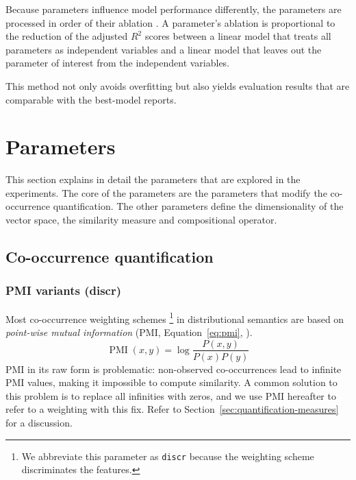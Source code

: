 Because parameters influence model performance differently, the parameters are processed in order of their ablation \cite{lapesa2014large}. A parameter's ablation is proportional to the reduction of the adjusted $R^2$ scores between a linear model that treats all parameters as independent variables and a linear model that leaves out the parameter of interest from the independent variables.

This method not only avoids overfitting but also yields evaluation results that are comparable with the best-model reports.

\section{Parameters}
\label{sec:parameters}

This section explains in detail the parameters that are explored in the experiments. The core of the parameters are the parameters that modify the co-occurrence quantification. The other parameters define the dimensionality of the vector space, the similarity measure and compositional operator.
%
%

\subsection{Co-occurrence quantification}
\label{sec:quantification}

\subsubsection{PMI variants (discr)}
\label{sec:pmi-variants}

Most co-occurrence weighting schemes%
\footnote{We abbreviate this parameter as \texttt{discr} because the weighting scheme discriminates the features.
}
in distributional semantics are based on \emph{point-wise mutual information} (PMI, Equation~\ref{eq:pmi}, ).
%
\begin{equation}
  \label{eq:pmi}
  \operatorname{PMI}(x, y) = \log\frac{P(x,y)}{P(x)P(y)}
\end{equation}
%
PMI in its raw form is problematic: non-observed co-occurrences lead to infinite PMI values, making it impossible to compute similarity. A common solution to this problem is to replace all infinities with zeros, and we use PMI hereafter to refer to a weighting with this fix. Refer to Section~\ref{sec:quantification-measures} for a discussion.

